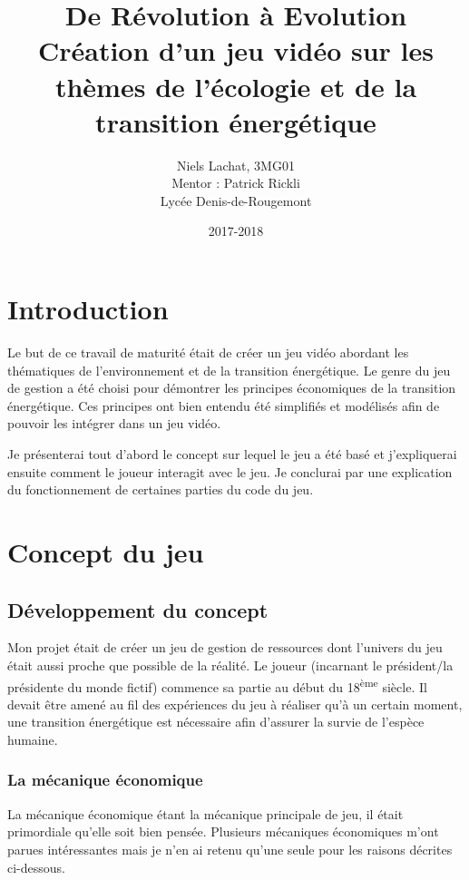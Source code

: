 \documentclass{article}
\title{De Révolution à Evolution \\ Création d'un jeu vidéo sur les thèmes de l'écologie et de la transition énergétique}
\date{2017-2018}
\author{Niels Lachat, 3MG01 \\ Mentor : Patrick Rickli \\ Lycée Denis-de-Rougemont}
\begin{document}
		

        \maketitle
        \newpage

        \tableofcontents
        \newpage

        \section{Introduction}
        Le but de ce travail de maturité était de créer un jeu vidéo abordant les thématiques de l'environnement et de la transition énergétique. 
        Le genre du jeu de gestion a été choisi pour démontrer les principes économiques de la transition énergétique.
        Ces principes ont bien entendu été simplifiés et modélisés afin de pouvoir les intégrer dans un jeu vidéo.
        
        
        Je présenterai tout d'abord le concept sur lequel le jeu a été basé et j'expliquerai ensuite comment le joueur interagit avec le jeu.
        Je conclurai par une explication du fonctionnement de certaines parties du code du jeu.

        \section{Concept du jeu}
        \subsection{Développement du concept}
        
        Mon projet était de créer un jeu de gestion de ressources dont l'univers du jeu était aussi proche que possible de la réalité. Le joueur (incarnant le président/la présidente du monde fictif) commence sa partie au début du 18\textsuperscript{ème} siècle. Il devait être amené au fil des expériences du jeu à réaliser qu'à un certain moment, une transition énergétique est nécessaire afin d'assurer la survie de l'espèce humaine.
        
        \subsubsection{La mécanique économique}
        La mécanique économique étant la mécanique principale de jeu, il était primordiale qu'elle soit bien pensée.
        Plusieurs mécaniques économiques m'ont parues intéressantes mais je n'en ai retenu qu'une seule pour les raisons décrites ci-dessous.
        
\end{document}

